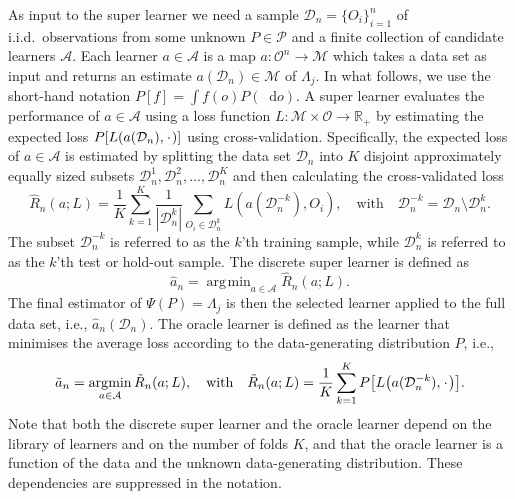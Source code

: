 \documentclass{statsoc}
\newcommand{\R}{\mathbb{R}}
\newcommand{\blank}{\makebox[1ex]{\textbf{$\cdot$}}}
\newcommand*\diff{\mathop{}\!\mathrm{d}}
\newcommand{\1}{\mathds{1}}
\DeclareMathOperator*{\argmin}{\arg\!\min}
\newcommand{\empmeas}{\ensuremath{\mathbb{P}_n}} %
\newcommand{\data}{\ensuremath{\mathcal{D}}}
\begin{document}
As input to the super learner we need a sample \( \data_n=\{O_i\}_{i=1}^n \) of
i.i.d.\ observations from some unknown \( P \in \mathcal{P} \) and a finite
collection of candidate learners $\mathcal{A}$. Each learner
\(a \in \mathcal{A}\) is a map
\( a \colon \mathcal{O}^n \rightarrow \mathcal{M}\) which takes a data set as
input and returns an estimate $a(\data_n) \in \mathcal{M}$ of $\Lambda_{j}$.
In what follows, we use the short-hand notation
\(P[f] = \int f(o) P(\diff o) \). A super learner evaluates the
performance of \(a \in \mathcal{A}\) using a loss function
\(L\colon \mathcal{M} \times \mathcal{O} \rightarrow \R_+\) by
estimating the expected loss \(P[L(a(\data_n), \blank)]\) using
cross-validation. Specifically, the expected loss of $a\in\mathcal A$
is estimated by splitting the data set $\data_n$ into $K$ disjoint
approximately equally sized subsets
\(\data_n^1, \data_n^2, \dots, \data_n^K \) and then calculating the
cross-validated loss
\begin{equation*}
  \hat{R}_n(a; L) =
  \frac{1}{K}\sum_{k=1}^{K}
  \frac{1}{| \data_n^{k} |}\sum_{O_i \in \data_n^{k}}
  L
  {
    \left(
      a{ (\data_n^{-k})}
      , O_i
    \right)
  },
  \quad \text{with} \quad
  \data_n^{-k} = \data_n \setminus \data_n^{k}.
\end{equation*}
The subset \(\data_n^{-k}\) is referred to as the \(k\)'th training
sample, while \(\data_n^{k}\) is referred to as the \(k\)'th test or
hold-out sample.
The discrete super learner is defined as
\begin{equation*}
\hat{a}_n = \argmin_{a\in\mathcal A}\hat{R}_n(a; L).
\end{equation*}
The final estimator of \(\Psi(P)=\Lambda_j\) is then the selected
learner applied to the full data set, i.e., \(\hat{a}_n(\data_n)\).
The oracle learner is defined as the learner that minimises the
average loss according to the data-generating distribution \( P \),
i.e.,
\begin{equation*}
  \tilde{a}_n =
  \argmin_{a \in \mathcal{A}}
  \tilde{R}_n(a; L),
  \quad \text{with} \quad 
  \tilde{R}_n(a; L)=
  \frac{1}{K}\sum_{k=1}^{K} 
  P{
    \left[
      L
      {
        \left(
          a{ (\data_n^{-k})}
          , \blank
        \right)
      }
    \right]}
  .
\end{equation*}
Note that both the discrete super learner and the oracle learner depend on the
library of learners and on the number of folds \(K\), and that the oracle
learner is a function of the data and the unknown data-generating distribution.
These dependencies are suppressed in the notation.
\end{document}
